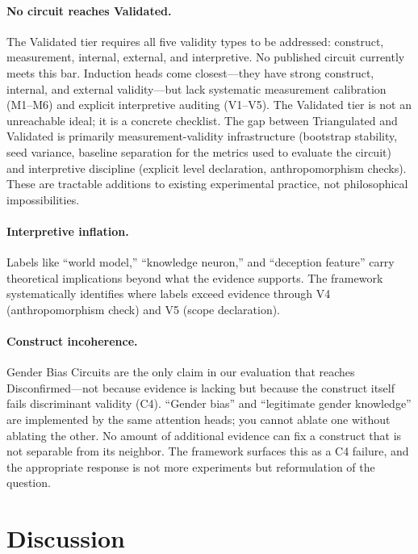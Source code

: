 \documentclass[10pt]{article}
\begin{document}
\paragraph{No circuit reaches Validated.} The Validated tier requires all five validity types to be addressed: construct, measurement, internal, external, and interpretive. No published circuit currently meets this bar. Induction heads come closest---they have strong construct, internal, and external validity---but lack systematic measurement calibration (M1--M6) and explicit interpretive auditing (V1--V5). The Validated tier is not an unreachable ideal; it is a concrete checklist. The gap between Triangulated and Validated is primarily measurement-validity infrastructure (bootstrap stability, seed variance, baseline separation for the metrics used to evaluate the circuit) and interpretive discipline (explicit level declaration, anthropomorphism checks). These are tractable additions to existing experimental practice, not philosophical impossibilities.

\paragraph{Interpretive inflation.} Labels like ``world model,'' ``knowledge neuron,'' and ``deception feature'' carry theoretical implications beyond what the evidence supports. The framework systematically identifies where labels exceed evidence through V4 (anthropomorphism check) and V5 (scope declaration).

\paragraph{Construct incoherence.} Gender Bias Circuits are the only claim in our evaluation that reaches Disconfirmed---not because evidence is lacking but because the construct itself fails discriminant validity (C4). ``Gender bias'' and ``legitimate gender knowledge'' are implemented by the same attention heads; you cannot ablate one without ablating the other. No amount of additional evidence can fix a construct that is not separable from its neighbor. The framework surfaces this as a C4 failure, and the appropriate response is not more experiments but reformulation of the question.

\section{Discussion}
\label{sec:discussion}
\end{document}
